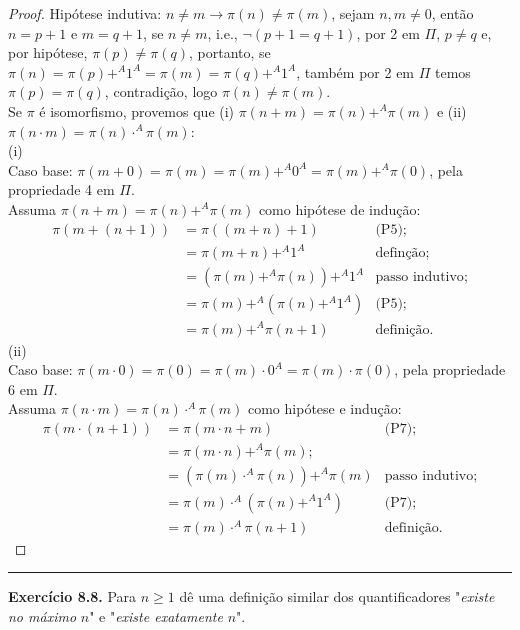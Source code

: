 \documentclass[11pt]{article}
\begin{document}
\begin{proof}
    Hipótese indutiva: $n\ne m\rightarrow\pi(n)\ne\pi(m)$, sejam $n,m\ne0$, então $n=p+1$ e $m=q+1$, se $n\ne m$, i.e., $\neg(p+1=q+1)$, por 2 em $\Pi$, $p\ne q$ e, por hipótese, $\pi(p)\ne\pi(q)$, portanto, se $\pi(n)=\pi(p)+^A1^A=\pi(m)=\pi(q)+^A1^A$, também por 2 em $\Pi$ temos $\pi(p)=\pi(q)$, contradição, logo $\pi(n)\ne\pi(m)$.\\
    Se $\pi$ é isomorfismo, provemos que (i) $\pi(n+m)=\pi(n)+^A\pi(m)$ e (ii) $\pi(n\cdot m)=\pi(n)\cdot^A\pi(m)$:\\
    (i)\\
    Caso base: $\pi(m+0)=\pi(m)=\pi(m)+^A0^A=\pi(m)+^A\pi(0)$, pela propriedade 4 em $\Pi$.\\
    Assuma $\pi(n+m)=\pi(n)+^A\pi(m)$ como hipótese de indução:
    \begin{align*}
        \pi(m+(n+1)) & = \pi((m + n) + 1) & \text{(P5)};\\
        & = \pi(m + n)+^A1^A & \text{definção};\\
        & = (\pi(m)+^A\pi(n))+^A1^A & \text{passo indutivo};\\
        & = \pi(m)+^A(\pi(n)+^A1^A) & \text{(P5)};\\
        & = \pi(m)+^A\pi(n+1) & \text{definição}.
    \end{align*}
    (ii)\\
    Caso base: $\pi(m\cdot0)=\pi(0)=\pi(m)\cdot0^A=\pi(m)\cdot\pi(0)$, pela propriedade 6 em $\Pi$.\\
    Assuma $\pi(n\cdot m)=\pi(n)\cdot^A\pi(m)$ como hipótese e indução:
    \begin{align*}
        \pi(m\cdot(n+1)) & = \pi(m\cdot n + m) & \text{(P7)};\\
        & = \pi(m\cdot n)+^A\pi(m); & \\
        & = (\pi(m)\cdot^A\pi(n))+^A\pi(m) & \text{passo indutivo};\\
        & = \pi(m)\cdot^A(\pi(n)+^A1^A) & \text{(P7)};\\
        & = \pi(m)\cdot^A\pi(n+1) & \text{definição}.
    \end{align*}
\end{proof}

\hrule

\begin{shaded}
\textbf{Exercício 8.8.} Para $n\ge1$ dê uma definição similar dos quantificadores "\textit{existe no máximo} $n$" e "\textit{existe exatamente} $n$".
\end{shaded}
\end{document}
